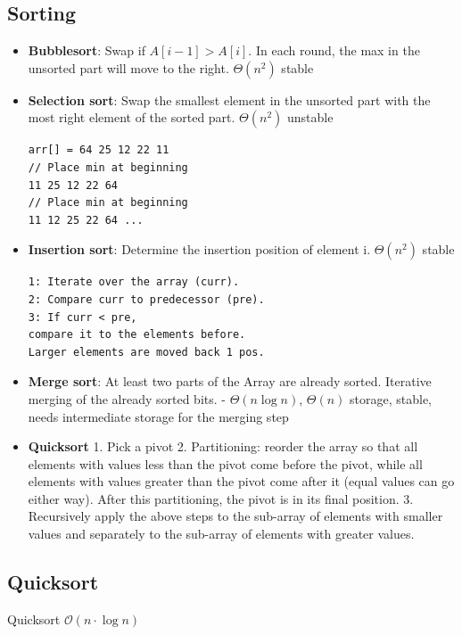 \documentclass[9pt,landscape,a4paper, table]{extarticle}
\begin{document}
\begin{multicols*}{3}
\section{Sorting}

\begin{itemize}
    \item \textbf{Bubblesort}: Swap if $A[i-1]> A[i]$. In each round, the max in the unsorted part will move to the right. $\Theta(n^2)$ stable
    \item \textbf{Selection sort}: Swap the smallest element in the unsorted part with the most right element of the sorted part. $\Theta(n^2)$ unstable
    
    \begin{verbatim}
arr[] = 64 25 12 22 11
// Place min at beginning
11 25 12 22 64
// Place min at beginning
11 12 25 22 64 ...
    \end{verbatim}
    
    \item \textbf{Insertion sort}: Determine the insertion position of element i. $\Theta(n^2)$ stable
    
\begin{verbatim}
1: Iterate over the array (curr).
2: Compare curr to predecessor (pre).
3: If curr < pre,
compare it to the elements before.
Larger elements are moved back 1 pos.
\end{verbatim}
    \item \textbf{Merge sort}: At least two parts of the Array are already sorted. Iterative merging of the already sorted bits. - $\Theta(n \log n)$,  $\Theta(n)$ storage, stable,  needs intermediate storage for the merging step

\item \textbf{Quicksort}
1. Pick a pivot 2. Partitioning: reorder the array so that all elements with values less than the pivot come before the pivot, while all elements with values greater than the pivot come after it (equal values can go either way). After this partitioning, the pivot is in its final position. 3. Recursively apply the above steps to the sub-array of elements with smaller values and separately to the sub-array of elements with greater values.
\end{itemize}



\subsection{Quicksort}
{\scriptsize
\begin{algorithm}[H]
    \caption{Quicksort $\mathcal{O}(n\cdot \log n)$}
    

\end{algorithm}}
\end{multicols*}
\end{document}
